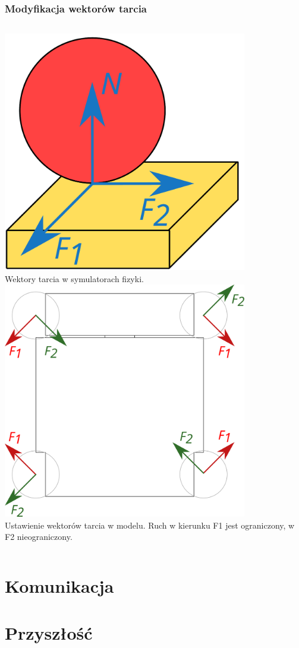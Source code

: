 \documentclass{beamer}
\begin{document}
	\begin{frame}
		\frametitle{Modyfikacja wektorów tarcia}
		\begin{columns}[c]
			\includegraphics[width=0.8\textwidth]{graphics/friction.pdf} \\
			Wektory tarcia w symulatorach fizyki.\footnotemark
			\includegraphics[width=0.8\textwidth]{graphics/base_vects.pdf} \\
			Ustawienie wektorów tarcia w modelu. Ruch w kierunku F1 jest ograniczony, w F2 nieograniczony.
		\end{columns}
	\end{frame}
	
	\section{Komunikacja}
	
	\section{Przyszłość}
\end{document}
